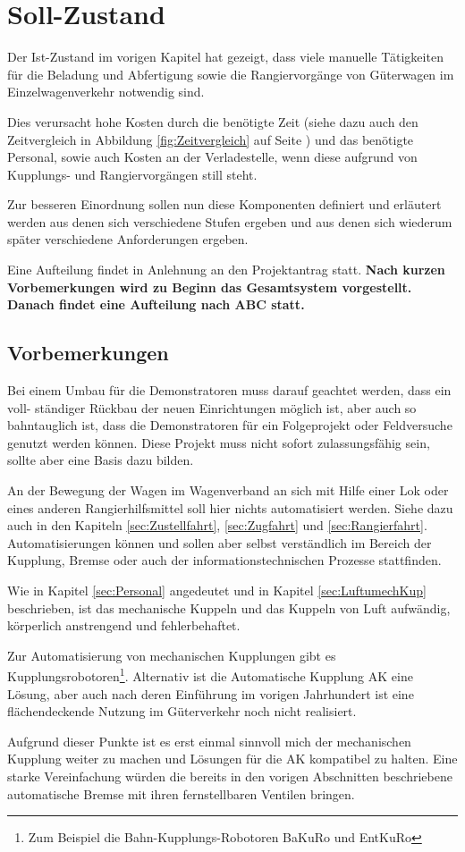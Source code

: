 \section{Soll-Zustand}
Der Ist-Zustand im vorigen Kapitel hat gezeigt, dass viele manuelle Tätigkeiten für die Beladung und Abfertigung sowie die Rangiervorgänge von Güterwagen im Einzelwagenverkehr notwendig sind.\par
Dies verursacht hohe Kosten durch die benötigte Zeit (siehe dazu auch den Zeitvergleich in Abbildung \ref{fig:Zeitvergleich} auf Seite \pageref{fig:Zeitvergleich}) und das benötigte Personal, sowie auch Kosten an der Verladestelle, wenn diese aufgrund von Kupplungs- und Rangiervorgängen still steht.\par
Zur besseren Einordnung sollen nun diese Komponenten definiert und erläutert werden aus denen sich verschiedene Stufen ergeben und aus denen sich wiederum später verschiedene Anforderungen ergeben.\par
Eine Aufteilung findet in Anlehnung an den Projektantrag statt. \textbf{Nach kurzen Vorbemerkungen wird zu Beginn das Gesamtsystem vorgestellt. Danach findet eine Aufteilung nach ABC statt.}
\subsection{Vorbemerkungen}
Bei einem Umbau für die Demonstratoren muss darauf geachtet werden, dass ein voll- ständiger Rückbau der neuen Einrichtungen möglich ist, aber auch so bahntauglich ist, dass die Demonstratoren für ein Folgeprojekt oder Feldversuche genutzt werden können. Diese Projekt muss nicht sofort zulassungsfähig sein, sollte aber eine Basis dazu bilden. \par
An der Bewegung der Wagen im Wagenverband an sich mit Hilfe einer Lok oder eines anderen Rangierhilfsmittel soll hier nichts automatisiert werden. Siehe dazu auch in den Kapiteln \ref{sec:Zustellfahrt}, \ref{sec:Zugfahrt} und \ref{sec:Rangierfahrt}. Automatisierungen können und sollen aber selbst verständlich im Bereich der Kupplung, Bremse oder auch der informationstechnischen Prozesse stattfinden.\par
Wie in Kapitel \ref{sec:Personal} angedeutet und in Kapitel \ref{sec:LuftumechKup} beschrieben, ist das mechanische Kuppeln und das Kuppeln von Luft aufwändig, körperlich anstrengend und fehlerbehaftet. \par
Zur Automatisierung von mechanischen Kupplungen gibt es Kupplungsrobotoren\footnote{Zum Beispiel die Bahn-Kupplungs-Robotoren BaKuRo und EntKuRo}. Alternativ ist die Automatische Kupplung \acrshort{AK} eine Lösung, aber auch nach deren Einführung im vorigen Jahrhundert ist eine flächendeckende Nutzung im Güterverkehr noch nicht realisiert.\par
Aufgrund dieser Punkte ist es erst einmal sinnvoll mich der mechanischen Kupplung weiter zu machen und Lösungen für die \acrshort{AK} kompatibel zu halten. Eine starke Vereinfachung würden die bereits in den vorigen Abschnitten beschriebene automatische Bremse mit ihren fernstellbaren Ventilen bringen.

